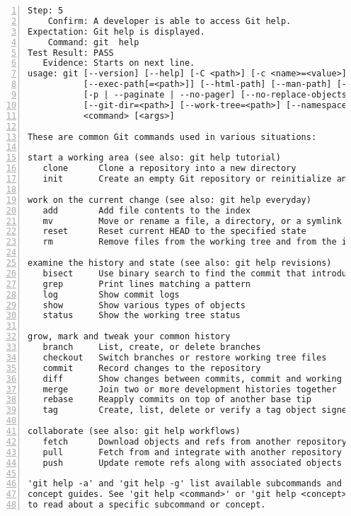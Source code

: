 \begin{lstlisting}[numbers=left]
       Step: 5
    Confirm: A developer is able to access Git help.
Expectation: Git help is displayed.
    Command: git  help 
Test Result: PASS
   Evidence: Starts on next line.
usage: git [--version] [--help] [-C <path>] [-c <name>=<value>]
           [--exec-path[=<path>]] [--html-path] [--man-path] [--info-path]
           [-p | --paginate | --no-pager] [--no-replace-objects] [--bare]
           [--git-dir=<path>] [--work-tree=<path>] [--namespace=<name>]
           <command> [<args>]

These are common Git commands used in various situations:

start a working area (see also: git help tutorial)
   clone      Clone a repository into a new directory
   init       Create an empty Git repository or reinitialize an existing one

work on the current change (see also: git help everyday)
   add        Add file contents to the index
   mv         Move or rename a file, a directory, or a symlink
   reset      Reset current HEAD to the specified state
   rm         Remove files from the working tree and from the index

examine the history and state (see also: git help revisions)
   bisect     Use binary search to find the commit that introduced a bug
   grep       Print lines matching a pattern
   log        Show commit logs
   show       Show various types of objects
   status     Show the working tree status

grow, mark and tweak your common history
   branch     List, create, or delete branches
   checkout   Switch branches or restore working tree files
   commit     Record changes to the repository
   diff       Show changes between commits, commit and working tree, etc
   merge      Join two or more development histories together
   rebase     Reapply commits on top of another base tip
   tag        Create, list, delete or verify a tag object signed with GPG

collaborate (see also: git help workflows)
   fetch      Download objects and refs from another repository
   pull       Fetch from and integrate with another repository or a local branch
   push       Update remote refs along with associated objects

'git help -a' and 'git help -g' list available subcommands and some
concept guides. See 'git help <command>' or 'git help <concept>'
to read about a specific subcommand or concept.

\end{lstlisting}
